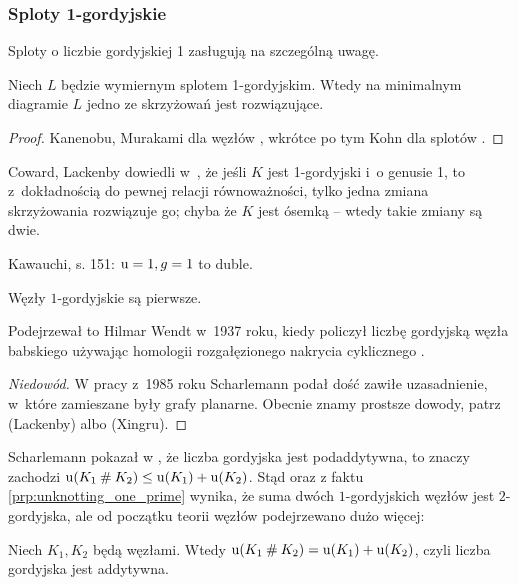 
\subsubsection{Sploty 1-gordyjskie}
Sploty o liczbie gordyjskiej 1 zasługują na szczególną uwagę.

\begin{proposition}
%
    Niech $L$ będzie wymiernym splotem 1-gordyjskim.
    Wtedy na minimalnym diagramie $L$ jedno ze skrzyżowań jest rozwiązujące.
\end{proposition}

\begin{proof}
%
%
%
    Kanenobu, Murakami dla węzłów \cite{kanenobumurakami86}, wkrótce po tym Kohn dla splotów \cite{kohn91}.
\end{proof}

Coward, Lackenby dowiedli w~\cite{coward11}, że jeśli $K$ jest 1-gordyjski i~o genusie 1, to z~dokładnością do pewnej relacji równoważności, tylko jedna zmiana skrzyżowania rozwiązuje go; chyba że $K$ jest ósemką -- wtedy takie zmiany są dwie.
%
%

\begin{tobedone}
    Kawauchi, s. 151: $\operatorname{u} = 1, g = 1$ to duble.
\end{tobedone}

\begin{proposition}
\label{prp:unknotting_one_prime}%
    Węzły $1$-gordyjskie są pierwsze.
\end{proposition}

Podejrzewał to Hilmar Wendt w~1937 roku, kiedy policzył liczbę gordyjską węzła babskiego używając homologii rozgałęzionego nakrycia cyklicznego \cite{wendt37}.
%

\begin{proof}[Niedowód]
%
%
%
    W pracy \cite{scharlemann85} z~1985 roku Scharlemann podał dość zawiłe uzasadnienie, w~które zamieszane były grafy planarne.
    Obecnie znamy prostsze dowody, patrz \cite{lackenby97} (Lackenby) albo \cite{zhang91} (Xingru).
\end{proof}

Scharlemann pokazał w \cite[wniosek 1.6]{scharlemann98}, że liczba gordyjska jest podaddytywna, to znaczy zachodzi $\operatorname{u}(K_1 \mathbin{\#} K_2) \le \operatorname{u}(K_1) + \operatorname{u}(K_2)$.
Stąd oraz z faktu \ref{prp:unknotting_one_prime} wynika, że suma dwóch $1$-gordyjskich węzłów jest $2$-gordyjska, ale od początku teorii węzłów podejrzewano dużo więcej:

\begin{conjecture}
%
    Niech $K_1, K_2$ będą węzłami.
    Wtedy $\operatorname{u} (K_1 \mathbin{\#} K_2) = \operatorname{u}(K_1) + \operatorname{u}(K_2)$, czyli liczba gordyjska jest addytywna.
\end{conjecture}

